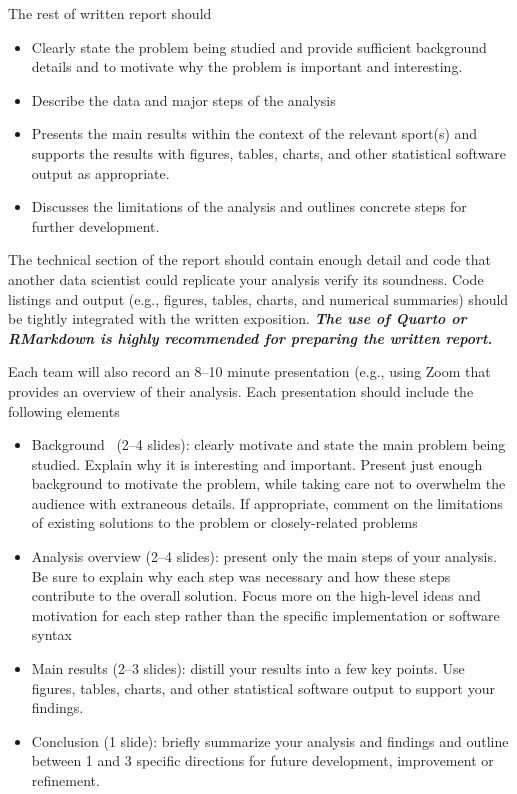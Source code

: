 \documentclass[11pt]{article}
\begin{document}
The rest of written report should 
\begin{itemize}
\item{Clearly state the problem being studied and provide sufficient background details and to motivate why the problem is important and interesting.}
\item{Describe the data and major steps of the analysis}
\item{Presents the main results within the context of the relevant sport(s) and supports the results with figures, tables, charts, and other statistical software output as appropriate.}
\item{Discusses the limitations of the analysis and outlines concrete steps for further development.}
\end{itemize}
The technical section of the report should contain enough detail and code that another data scientist could replicate your analysis verify its soundness.
Code listings and output (e.g., figures, tables, charts, and numerical summaries) should be tightly integrated with the written exposition.
\emph{\textbf{The use of Quarto or RMarkdown is highly recommended for preparing the written report.}}

Each team will also record an 8--10 minute presentation (e.g., using Zoom that provides an overview of their analysis.
Each presentation should include the following elements
\begin{itemize}
\item{Background  (2--4 slides): clearly motivate and state the main problem being studied. Explain why it is interesting and important. Present just enough background to motivate the problem, while taking care not to overwhelm the audience with extraneous details. If appropriate, comment on the limitations of existing solutions to the problem or closely-related problems}
\item{Analysis overview (2--4 slides): present only the main steps of your analysis. Be sure to explain why each step was necessary and how these steps contribute to the overall solution. Focus more on the high-level ideas and motivation for each step rather than the specific implementation or software syntax}
\item{Main results (2--3 slides): distill your results into a few key points. Use figures, tables, charts, and other statistical software output to support your findings.}
\item{Conclusion (1 slide): briefly summarize your analysis and findings and outline between 1 and 3 specific directions for future development, improvement or refinement.}
\end{itemize}
\end{document}
